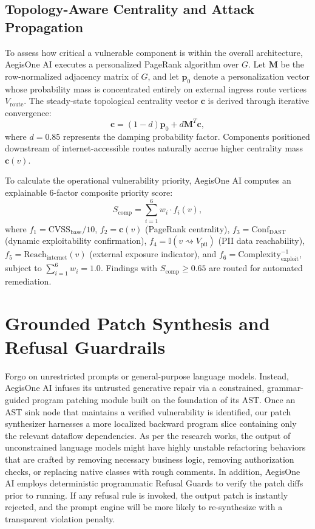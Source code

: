 \documentclass[journal,twoside]{IEEEtran}
\begin{document}
\subsection{Topology-Aware Centrality and Attack Propagation}
To assess how critical a vulnerable component is within the overall architecture, AegisOne AI executes a personalized PageRank algorithm over $G$. Let $\mathbf{M}$ be the row-normalized adjacency matrix of $G$, and let $\mathbf{p}_0$ denote a personalization vector whose probability mass is concentrated entirely on external ingress route vertices $V_{\text{route}}$. The steady-state topological centrality vector $\mathbf{c}$ is derived through iterative convergence:
\begin{equation}
\mathbf{c} = (1 - d)\mathbf{p}_0 + d \mathbf{M}^T \mathbf{c},
\end{equation}
where $d = 0.85$ represents the damping probability factor. Components positioned downstream of internet-accessible routes naturally accrue higher centrality mass $\mathbf{c}(v)$.

To calculate the operational vulnerability priority, AegisOne AI computes an explainable 6-factor composite priority score:
\begin{equation}
S_{\text{comp}} = \sum_{i=1}^6 w_i \cdot f_i(v),
\end{equation}
where $f_1 = \text{CVSS}_{\text{base}} / 10$, $f_2 = \mathbf{c}(v)$ (PageRank centrality), $f_3 = \text{Conf}_{\text{DAST}}$ (dynamic exploitability confirmation), $f_4 = \mathbb{I}(v \rightsquigarrow V_{\text{pii}})$ (PII data reachability), $f_5 = \text{Reach}_{\text{internet}}(v)$ (external exposure indicator), and $f_6 = \text{Complexity}_{\text{exploit}}^{-1}$, subject to $\sum_{i=1}^6 w_i = 1.0$. Findings with $S_{\text{comp}} \ge 0.65$ are routed for automated remediation.

\section{Grounded Patch Synthesis and Refusal Guardrails}
Forgo on unrestricted prompts or general-purpose language models. Instead, AegisOne AI infuses its untrusted generative repair via a constrained, grammar-guided program patching module built on the foundation of its AST. Once an AST sink node that maintains a verified vulnerability is identified, our patch synthesizer harnesses a more localized backward program slice containing only the relevant dataflow dependencies. As per the research works, the output of unconstrained language models might have highly unstable refactoring behaviors that are crafted by removing necessary business logic, removing authorization checks, or replacing native classes with rough comments. In addition, AegisOne AI employs deterministic programmatic Refusal Guards to verify the patch diffs prior to running. If any refusal rule is invoked, the output patch is instantly rejected, and the prompt engine will be more likely to re-synthesize with a transparent violation penalty.
\end{document}
